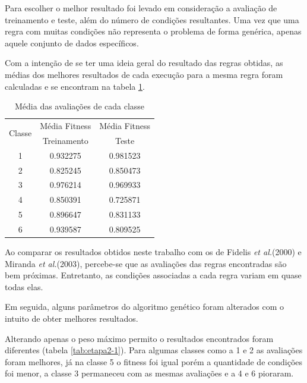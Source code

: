 \documentclass[11pt]{article}
\begin{document}
Para escolher o melhor resultado foi levado em consideração a avaliação de
treinamento e teste, além do número de condições resultantes. Uma vez que uma
regra com muitas condições não representa o problema de forma genérica, apenas
aquele conjunto de dados específicos.

Com a intenção de se ter uma ideia geral do resultado das regras obtidas, as médias
dos melhores resultados de cada execução para a mesma regra foram calculadas e
se encontram na tabela \ref{tab:medias}.

\begin{table}[h]
  \centering
  \begin{tabular}{|c|c|c|}
    \hline
    \multirow{2}{*}{Classe} & Média Fitness & Média Fitness \\
    & Treinamento & Teste \\
    \hline
    1 & 0.932275 & 0.981523\\
    \hline
    2 & 0.825245 & 0.850473\\
    \hline
    3 & 0.976214 & 0.969933\\
    \hline
    4 & 0.850391 & 0.725871\\
    \hline
    5 & 0.896647 & 0.831133\\
    \hline
    6 & 0.939587 & 0.809525\\
    \hline
  \end{tabular}
  \caption{Média das avaliações de cada classe}
  \label{tab:medias}
\end{table}

Ao comparar os resultados obtidos neste trabalho com os de Fidelis \textit{et al.}(2000) e
Miranda \textit{et al.}(2003), percebe-se que as avaliações das regras encontradas
são bem próximas. Entretanto, as condições associadas a cada regra variam em quase
todas elas.

Em seguida, alguns parâmetros do algoritmo genético foram alterados com o intuito
de obter melhores resultados.

Alterando apenas o peso máximo permito o resultados encontrados foram diferentes
(tabela \ref{tab:etapa2-1}).
Para algumas classes como a 1 e 2 as avaliações foram melhores, já na classe 5
o fitness foi igual porém a quantidade de condições foi menor, a classe 3 permaneceu
com as mesmas avaliações e a 4 e 6 pioraram.
\end{document}

